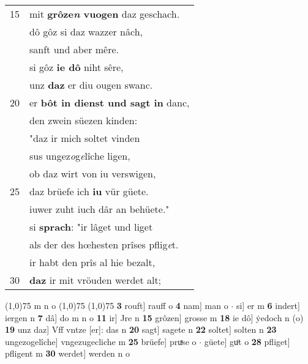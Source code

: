 \documentclass[8pt,a4paper,notitlepage]{article}
\begin{document}
\begin{table}[ht]
\begin{minipage}[t]{0.5\linewidth}
\begin{tabular}{rl}
15 & mit \textbf{grôze\textit{n} vuogen} daz geschach.\\ 
 & dô gôz si daz wazzer nâch,\\ 
 & sanft und aber mêre.\\ 
 & si gôz \textbf{ie dô} niht sêre,\\ 
 & unz \textbf{daz} er diu ougen swanc.\\ 
20 & er \textbf{bôt in dienst und sagt in} danc,\\ 
 & den zwein süezen kinden:\\ 
 & "daz ir mich soltet vinden\\ 
 & sus ungez\textit{o}g\textit{e}lîche ligen,\\ 
 & ob daz wirt von iu verswigen,\\ 
25 & daz brüefe ich \textbf{iu} vür güete.\\ 
 & iuwer zuht iuch dâr an behüete."\\ 
 & si \textbf{sprach}: "ir lâget und liget\\ 
 & als der des hœhesten prîses pflig\textit{e}t.\\ 
 & ir habt den prîs al hie bezalt,\\ 
30 & \textbf{daz} ir mit vröuden werdet alt;\\ 
\end{tabular}
\scriptsize
\line(1,0){75} \newline
m n o \newline
\line(1,0){75} \newline
\newline
\line(1,0){75} \newline
\textbf{3} rouft] rauff o \textbf{4} nam] man o  $\cdot$ si] er m \textbf{6} indert] iergen n \textbf{7} dâ] do m n o \textbf{11} ir] Jre n \textbf{15} grôzen] grosse m \textbf{18} ie dô] ẏedoch n (o) \textbf{19} unz daz] Vff vntze [er]: das n \textbf{20} sagt] sagete n \textbf{22} soltet] solten n \textbf{23} ungezogelîche] vngezugecliche m \textbf{25} brüefe] pruͯse o  $\cdot$ güete] guͦt o \textbf{28} pfliget] pfligent m \textbf{30} werdet] werden n o \newline
\end{minipage}
\end{table}
\newpage
\end{document}
